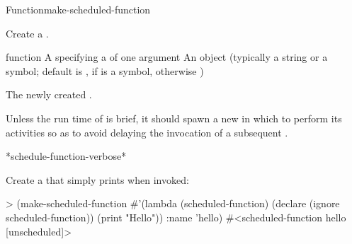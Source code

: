 
\begin{functiondoc}{Function}{make-scheduled-function}{ 
     
    \returns{} } 
%
%
%
%

\fnsyntax

\fnpurpose Create a .

\fnpackage {}

\fnmodule {}

\fnargs
\begin{args}{function}
\arg[function] A  specifying a
  of one argument
\arg[name] An object (typically a string or a symbol; default is
, if  is a symbol, otherwise \nil)
\end{args}

\fnreturns The newly created . 

\fnerrors
\nothreads{}

\fndescription Unless the run time of  is brief, it
should spawn a new  in which to perform its activities
so as to avoid delaying the invocation of a subsequent
.

\begin{alsos}{*schedule-function-verbose*}
\end{alsos}

\fnexamples
%
Create a  that simply prints  when
invoked:
%
\W\supp
\begin{example}
> (make-scheduled-function 
    #'(lambda (scheduled-function)
        (declare (ignore scheduled-function))
        (print "Hello"))
    :name 'hello)
#<scheduled-function hello [unscheduled]>
\end{example}


\end{functiondoc}

